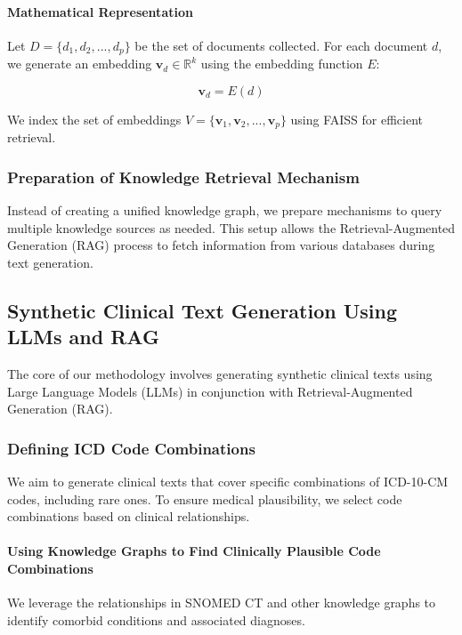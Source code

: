 \documentclass[12pt, a4paper]{article}
\begin{document}
\paragraph{Mathematical Representation}

Let \( D = \{d_1, d_2, ..., d_p\} \) be the set of documents collected. For each document \( d \), we generate an embedding \( \mathbf{v}_d \in \mathbb{R}^k \) using the embedding function \( E \):

\[
\mathbf{v}_d = E(d)
\]

We index the set of embeddings \( V = \{\mathbf{v}_1, \mathbf{v}_2, ..., \mathbf{v}_p\} \) using FAISS for efficient retrieval.

\subsubsection{Preparation of Knowledge Retrieval Mechanism}

Instead of creating a unified knowledge graph, we prepare mechanisms to query multiple knowledge sources as needed. This setup allows the Retrieval-Augmented Generation (RAG) process to fetch information from various databases during text generation.

\subsection{Synthetic Clinical Text Generation Using LLMs and RAG}

The core of our methodology involves generating synthetic clinical texts using Large Language Models (LLMs) in conjunction with Retrieval-Augmented Generation (RAG).

\subsubsection{Defining ICD Code Combinations}

We aim to generate clinical texts that cover specific combinations of ICD-10-CM codes, including rare ones. To ensure medical plausibility, we select code combinations based on clinical relationships.

\paragraph{Using Knowledge Graphs to Find Clinically Plausible Code Combinations}

We leverage the relationships in SNOMED CT and other knowledge graphs to identify comorbid conditions and associated diagnoses.
\end{document}
